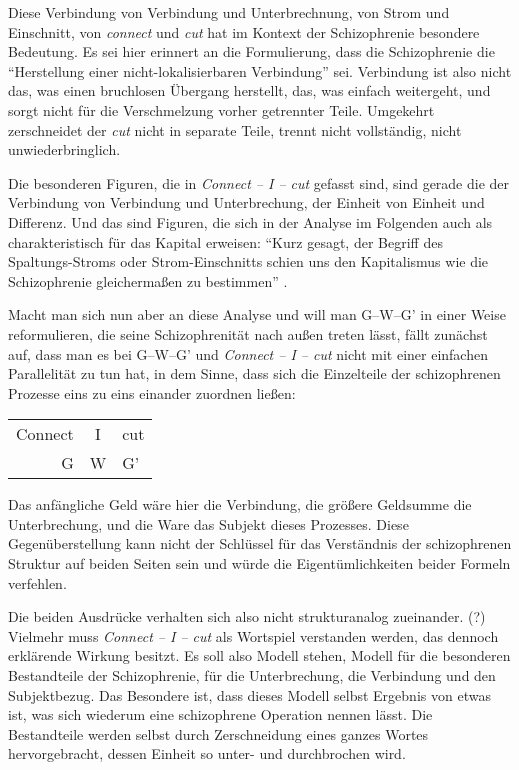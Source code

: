 \documentclass[12pt,
               paper=a4,
               twoside=false,
               onehalfspacing,
               bibliography=totoc,
               toc=graduated,
               ]{scrartcl}
\newcommand{\pc}[2]{\parencite[#1]{#2}}
\newcommand{\worries}[1]{\ifdraft{\textcolor{blue}{\texttt{(#1)}}}{}}
\newcommand{\gwg}{G--W--G'\xspace}
\newcommand{\cic}{Connect -- I -- cut\xspace}
\begin{document}

Diese Verbindung von Verbindung und Unterbrechnung, von Strom und
Einschnitt, von \emph{connect} und \emph{cut} hat im Kontext der
Schizophrenie besondere Bedeutung. Es sei hier erinnert an die
Formulierung, dass die Schizophrenie die "`Herstellung einer
nicht-lokalisierbaren Verbindung"' \pc{19}{schizg} sei. Verbindung ist
also nicht das, was einen bruchlosen Übergang herstellt, das, was
einfach weitergeht, und sorgt nicht für die Verschmelzung vorher
getrennter Teile. Umgekehrt zerschneidet der \emph{cut} nicht in
separate Teile, trennt nicht vollständig, nicht unwiederbringlich.

Die besonderen Figuren, die in \emph{\cic} gefasst sind, sind gerade
die der Verbindung von Verbindung und Unterbrechung, der Einheit von
Einheit und Differenz. Und das sind Figuren, die sich in der Analyse
im Folgenden auch als charakteristisch für das Kapital erweisen:
"`Kurz gesagt, der Begriff des Spaltungs-Stroms oder Strom-Einschnitts
schien uns den Kapitalismus wie die Schizophrenie gleichermaßen zu
bestimmen"' \pc{317}{ao}.



Macht man sich nun aber an diese Analyse und will man \gwg in einer
Weise reformulieren, die seine Schizophrenität nach außen treten
lässt, fällt zunächst auf, dass man es bei \gwg und \emph{\cic} nicht
mit einer einfachen Parallelität zu tun hat, in dem Sinne, dass sich
die Einzelteile der schizophrenen Prozesse eins zu eins einander
zuordnen ließen:

{\centering\hfill
\begin{tabular}{r@{ -- }c@{ -- }l}
Connect & I & cut\\
G & W & G'
\end{tabular}
\hfill}

Das anfängliche Geld wäre hier die Verbindung, die größere Geldsumme
die Unterbrechung, und die Ware das Subjekt dieses Prozesses. Diese
Gegenüberstellung kann nicht der Schlüssel für das Verständnis der
schizophrenen Struktur auf beiden Seiten sein und würde die
Eigentümlichkeiten beider Formeln verfehlen.

Die beiden Ausdrücke verhalten sich also nicht strukturanalog
zueinander. (?) Vielmehr muss \emph{\cic} als Wortspiel verstanden
werden, das dennoch erklärende Wirkung besitzt. Es soll also Modell
stehen, Modell für die besonderen Bestandteile der Schizophrenie, für
die Unterbrechung, die Verbindung und den Subjektbezug. Das Besondere
ist, dass dieses Modell selbst Ergebnis von etwas ist, was sich
wiederum eine schizophrene Operation nennen lässt. Die Bestandteile
werden selbst durch Zerschneidung eines ganzes Wortes hervorgebracht,
dessen Einheit so unter- und durchbrochen wird.
\end{document}

